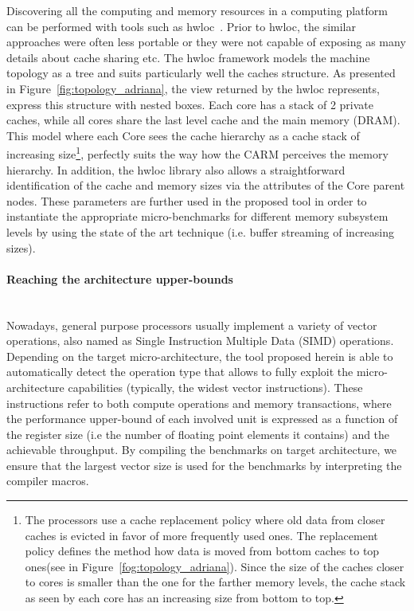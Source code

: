 \documentclass[twoside,twocolumn,8pt]{extarticle}
\begin{document}
Discovering all the computing and memory resources in a computing platform can be performed with tools such as
hwloc~\cite{goglin:hal-01330194}. Prior to hwloc,  the similar approaches were often less portable or they were not capable of
exposing as many details about cache sharing etc. The hwloc framework models the machine topology as a tree and suits particularly
well the caches structure.
As presented in Figure~\ref{fig:topology_adriana}, the view returned by the hwloc represents, express this structure with nested
boxes. Each core has a stack of 2 private caches, while all cores share the last level cache and the main memory (DRAM).
This model where each Core sees  the cache hierarchy as a cache stack of increasing size\footnote{
  The processors use a cache replacement policy where old data from closer caches is evicted in favor of more frequently used ones.
  The replacement policy defines the method how data is moved from bottom caches to top ones(see in
  Figure~\ref{fog:topology_adriana}). Since the size of the caches closer to cores is smaller than the one for the farther memory
  levels, the cache stack as seen by each core has an increasing size from bottom to top.
}, perfectly suits the way how the CARM perceives the memory hierarchy.
In addition, the hwloc library also allows a straightforward identification of the cache and memory sizes via the  attributes of
the Core parent nodes. These parameters are further used in the proposed tool  in order to instantiate the appropriate
micro-benchmarks for different memory subsystem levels by using the state of the art technique (i.e. buffer streaming of
increasing sizes).

\paragraph*{Reaching the architecture upper-bounds}\mbox{}\\

Nowadays, general purpose processors usually implement a variety of vector operations, also named as Single Instruction Multiple
Data (SIMD) operations. Depending on the target micro-architecture,  the tool proposed herein is able to automatically detect the
operation type that allows to fully exploit the micro-architecture capabilities  (typically, the widest vector instructions). These
instructions refer to both compute operations and memory transactions, where the performance upper-bound of each involved unit is
expressed as a function of the register size (i.e the number of floating point  elements it contains) and the achievable
throughput. By compiling the benchmarks on target architecture, we ensure that the largest vector size is used for the benchmarks
by interpreting the compiler macros. 
\end{document}
